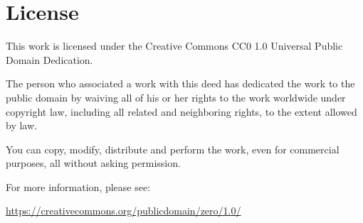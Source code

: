 \chapter*{License}
\vspace{1cm}

\begin{center}
    \cczero
\end{center}

\vspace{1cm}

This work is licensed under the Creative Commons CC0 1.0 Universal Public Domain Dedication.

The person who associated a work with this deed has dedicated the work to the public domain by waiving all of his or her rights to the work worldwide under copyright law, including all related and neighboring rights, to the extent allowed by law.

You can copy, modify, distribute and perform the work, even for commercial purposes, all without asking permission.

For more information, please see:
\begin{center}
    \url{https://creativecommons.org/publicdomain/zero/1.0/}
\end{center}
